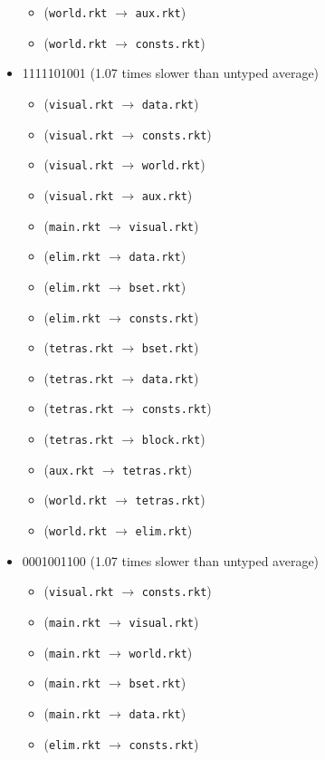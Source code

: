 \documentclass{article}
\newcommand{\mono}[1]{\texttt{#1}}
\begin{document}
\begin{itemize}
\begin{itemize}
  \item (\mono{world.rkt} $\rightarrow$ \mono{aux.rkt})
  \item (\mono{world.rkt} $\rightarrow$ \mono{consts.rkt})
  \end{itemize}
\item 1111101001 (1.07 times slower than untyped average)
  \begin{itemize}
  \item (\mono{visual.rkt} $\rightarrow$ \mono{data.rkt})
  \item (\mono{visual.rkt} $\rightarrow$ \mono{consts.rkt})
  \item (\mono{visual.rkt} $\rightarrow$ \mono{world.rkt})
  \item (\mono{visual.rkt} $\rightarrow$ \mono{aux.rkt})
  \item (\mono{main.rkt} $\rightarrow$ \mono{visual.rkt})
  \item (\mono{elim.rkt} $\rightarrow$ \mono{data.rkt})
  \item (\mono{elim.rkt} $\rightarrow$ \mono{bset.rkt})
  \item (\mono{elim.rkt} $\rightarrow$ \mono{consts.rkt})
  \item (\mono{tetras.rkt} $\rightarrow$ \mono{bset.rkt})
  \item (\mono{tetras.rkt} $\rightarrow$ \mono{data.rkt})
  \item (\mono{tetras.rkt} $\rightarrow$ \mono{consts.rkt})
  \item (\mono{tetras.rkt} $\rightarrow$ \mono{block.rkt})
  \item (\mono{aux.rkt} $\rightarrow$ \mono{tetras.rkt})
  \item (\mono{world.rkt} $\rightarrow$ \mono{tetras.rkt})
  \item (\mono{world.rkt} $\rightarrow$ \mono{elim.rkt})
  \end{itemize}
\item 0001001100 (1.07 times slower than untyped average)
  \begin{itemize}
  \item (\mono{visual.rkt} $\rightarrow$ \mono{consts.rkt})
  \item (\mono{main.rkt} $\rightarrow$ \mono{visual.rkt})
  \item (\mono{main.rkt} $\rightarrow$ \mono{world.rkt})
  \item (\mono{main.rkt} $\rightarrow$ \mono{bset.rkt})
  \item (\mono{main.rkt} $\rightarrow$ \mono{data.rkt})
  \item (\mono{elim.rkt} $\rightarrow$ \mono{consts.rkt})

\end{itemize}
\end{itemize}
\end{document}
